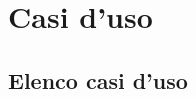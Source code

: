 \documentclass[a4paper, oneside, dvipsnames, table]{article}
\begin{document}
\copertina{}
\newpage



\fancyAR{}

\clearpage
\tableofcontents
\clearpage

\section{Casi d'uso}

\subsection{Elenco casi d'uso}
\setcounter{secnumdepth}{0}

\end{document}
